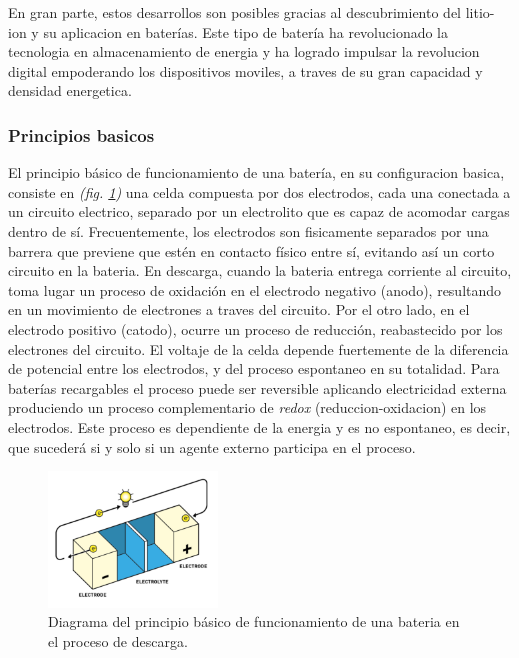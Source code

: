 \documentclass[10pt,a4paper]{article}
\begin{document}
    \noindent En gran parte, estos desarrollos son posibles gracias al
    descubrimiento del litio-ion y su aplicacion en baterías. Este tipo de
    batería ha revolucionado la tecnologia en almacenamiento de energia y ha
    logrado impulsar la revolucion digital empoderando los dispositivos moviles,
    a traves de su gran capacidad y densidad energetica.

    \subsubsection{Principios basicos}

    El principio básico de funcionamiento de una batería, en su configuracion
    basica, consiste en \emph{(fig. \ref{batt_wk_ppl})} una celda 
    compuesta por dos electrodos, cada una conectada a un circuito 
    electrico, separado por un electrolito que es capaz de acomodar cargas
    dentro de sí. Frecuentemente, los electrodos son fisicamente separados por
    una barrera que previene que estén en contacto físico entre sí, evitando así
    un corto circuito en la bateria. En descarga, cuando la bateria
    entrega corriente al circuito, toma lugar un proceso de oxidación en el
    electrodo negativo (anodo), resultando en un movimiento de electrones a
    traves del circuito. Por el otro lado, en el electrodo positivo (catodo),
    ocurre un proceso de reducción, reabastecido por los electrones del
    circuito. El voltaje de la celda depende fuertemente de la diferencia de
    potencial entre los electrodos, y del proceso espontaneo en su totalidad.
    Para baterías recargables el proceso puede ser reversible aplicando
    electricidad externa produciendo un proceso complementario de \emph{redox}
    (reduccion-oxidacion) en los electrodos. Este proceso es dependiente de la
    energia y es no espontaneo, es decir, que sucederá si y solo si un agente
    externo participa en el proceso.

    \begin{figure}[h!]
        \begin{center}
            \includegraphics[width=0.4\textwidth]{batt_func_ppr.png}
        \end{center}
        \caption{Diagrama del principio básico de funcionamiento de una bateria en el
        proceso de descarga.}
        \label{batt_wk_ppl}
    \end{figure}
\end{document}
